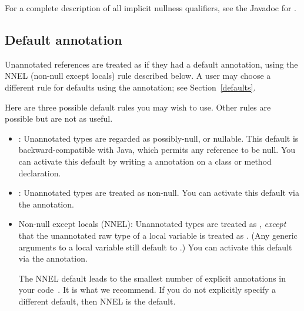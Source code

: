 For a complete description of all implicit nullness qualifiers, see the
Javadoc for .



\subsection{Default annotation\label{null-defaults}}

Unannotated references are treated as if they had a default annotation,
using the NNEL (non-null except locals) rule described below.
A user may choose a different rule for defaults using the 
 annotation; see
Section~\ref{defaults}.

\begin{sloppy}
Here are three possible default rules you may wish to use.  Other rules are
possible but are not as useful.
\begin{itemize}
\item
  :  Unannotated types are regarded as possibly-null, or
  nullable.  This default is backward-compatible with Java, which permits
  any reference to be null.  You can activate this default by writing
  a  annotation on a
  class or method
  declaration.
\item
  :  Unannotated types are treated as non-null.
  You can activate this
  default via the
   annotation.
\item
  Non-null except locals (NNEL):  Unannotated types are treated as
  , \emph{except} that the unannotated raw type of a local
  variable is treated as .  (Any generic arguments to a
  local variable still default to .)  You can activate this
  default via the  annotation.

  The NNEL default leads to the smallest number of explicit annotations in
  your code~\cite{PapiACPE2008}.  It is what we recommend.  If you do not
  explicitly specify a different default, then NNEL is the default.
\end{itemize}
\end{sloppy}

